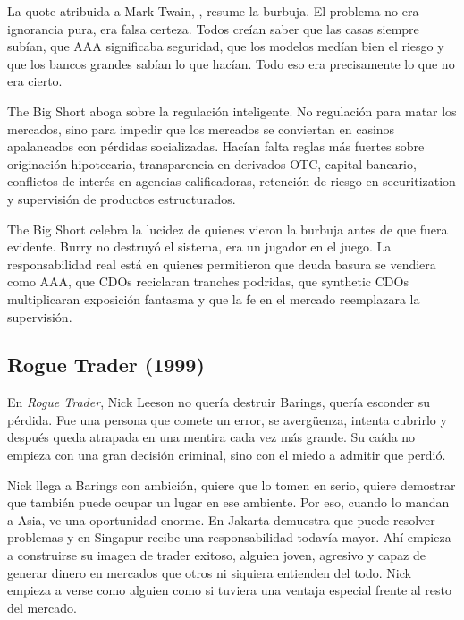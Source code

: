 La quote atribuida a Mark Twain, , resume la burbuja. El problema no era ignorancia pura, era falsa certeza. Todos creían saber que las casas siempre subían, que AAA significaba seguridad, que los modelos medían bien el riesgo y que los bancos grandes sabían lo que hacían. Todo eso era precisamente lo que no era cierto.

The Big Short aboga sobre la regulación inteligente. No regulación para matar los mercados, sino para impedir que los mercados se conviertan en casinos apalancados con pérdidas socializadas. Hacían falta reglas más fuertes sobre originación hipotecaria, transparencia en derivados OTC, capital bancario, conflictos de interés en agencias calificadoras, retención de riesgo en securitization y supervisión de productos estructurados.

The Big Short celebra la lucidez de quienes vieron la burbuja antes de que fuera evidente. Burry no destruyó el sistema, era un jugador en el juego. La responsabilidad real está en quienes permitieron que deuda basura se vendiera como AAA, que CDOs reciclaran tranches podridas, que synthetic CDOs multiplicaran exposición fantasma y que la fe en el mercado reemplazara la supervisión.






\subsection{Rogue Trader (1999)}
En \textit{Rogue Trader}, Nick Leeson no quería destruir Barings, quería esconder su pérdida. Fue una persona que comete un error, se avergüenza, intenta cubrirlo y después queda atrapada en una mentira cada vez más grande. Su caída no empieza con una gran decisión criminal, sino con el miedo a admitir que perdió.

Nick llega a Barings con ambición, quiere que lo tomen en serio, quiere demostrar que también puede ocupar un lugar en ese ambiente. Por eso, cuando lo mandan a Asia, ve una oportunidad enorme. En Jakarta demuestra que puede resolver problemas y en Singapur recibe una responsabilidad todavía mayor. Ahí empieza a construirse su imagen de trader exitoso, alguien joven, agresivo y capaz de generar dinero en mercados que otros ni siquiera entienden del todo. Nick empieza a verse como alguien como si tuviera una ventaja especial frente al resto del mercado.

